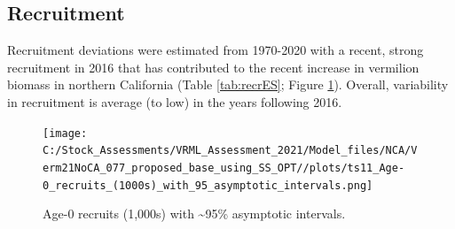 \documentclass[11pt,
  english,
  a4paper,
]{article}
\begin{document}
\FloatBarrier


\hypertarget{recruitment}{%
\subsection*{Recruitment}\label{recruitment}}

\leavevmode\tagmcend\tagstructend

Recruitment deviations were estimated from 1970-2020 with a recent, strong recruitment in 2016 that has contributed to the recent increase in vermilion biomass in northern California (Table \ref{tab:recrES}; Figure \ref{fig:recruitsES}). Overall, variability in recruitment is average (to low) in the years following 2016.

\begin{figure}
\centering
\texttt{[image: C:/Stock\_Assessments/VRML\_Assessment\_2021/Model\_files/NCA/Verm21NoCA\_077\_proposed\_base\_using\_SS\_OPT//plots/ts11\_Age-0\_recruits\_(1000s)\_with\_95\_asymptotic\_intervals.png]}
\caption{Age-0 recruits (1,000s) with \textasciitilde95\% asymptotic intervals.\label{fig:recruitsES}}
\end{figure}
\end{document}
